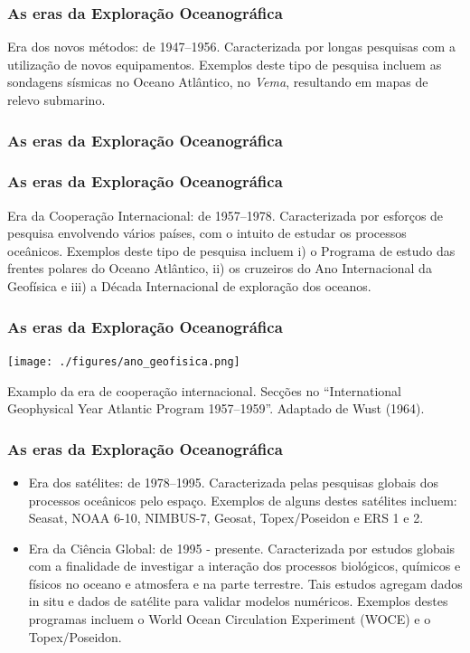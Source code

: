 \begin{frame}
    \frametitle{As eras da Exploração Oceanográfica}
    Era dos novos métodos: de 1947--1956.  Caracterizada por longas pesquisas
    com a utilização de novos equipamentos.  Exemplos deste tipo de pesquisa
    incluem as sondagens sísmicas no Oceano Atlântico, no {\it Vema},
    resultando em mapas de relevo submarino.
\end{frame}

\begin{frame}
    \frametitle{As eras da Exploração Oceanográfica}
    \centerline{}
\end{frame}

\begin{frame}
    \frametitle{As eras da Exploração Oceanográfica}
    Era da Cooperação Internacional: de 1957--1978. Caracterizada por esforços
    de pesquisa envolvendo vários países, com o intuito de estudar os processos
    oceânicos.  Exemplos deste tipo de pesquisa incluem i) o Programa de estudo
    das frentes polares do Oceano Atlântico, ii) os cruzeiros do Ano
    Internacional da Geofísica e iii) a Década Internacional de exploração dos
    oceanos.
\end{frame}

\begin{frame}
    \frametitle{As eras da Exploração Oceanográfica}
    \centerline{\texttt{[image: ./figures/ano\_geofisica.png]}}
    Examplo da era de cooperação internacional.  Secções no ``International
    Geophysical Year Atlantic Program 1957--1959''.  Adaptado de Wust (1964).
\end{frame}

\begin{frame}
    \frametitle{As eras da Exploração Oceanográfica}
    \begin{itemize}[<+-| alert@+>]
    \item \small{Era dos satélites: de 1978--1995. Caracterizada pelas pesquisas
           globais dos processos oceânicos pelo espaço. Exemplos de alguns
           destes satélites incluem: Seasat, NOAA 6-10, NIMBUS-7, Geosat,
           Topex/Poseidon e ERS 1 e 2.}

    \item \small{Era da Ciência Global: de 1995 - presente. Caracterizada por
           estudos globais com a finalidade de investigar a interação dos
           processos biológicos, químicos e físicos no oceano e atmosfera e na
           parte terrestre. Tais estudos agregam dados in situ e dados de
           satélite para validar modelos numéricos. Exemplos destes programas
           incluem o World Ocean Circulation Experiment (WOCE) e o
           Topex/Poseidon.}
    \end{itemize}
\end{frame}


